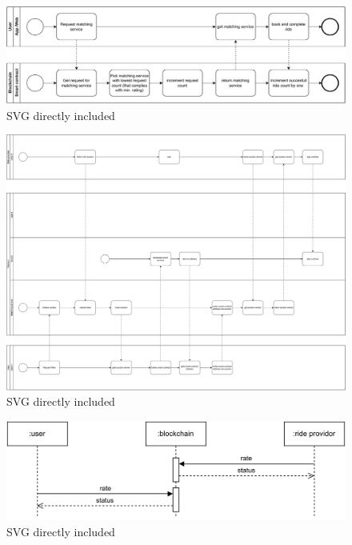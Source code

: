 \begin{figure}
    \centering
    \includegraphics[width=\linewidth]{data/4.svg}
    \caption{SVG directly included}
    \label{fig:directSVG}
\end{figure}







\begin{figure}
    \centering
    \includegraphics[width=\linewidth]{data/5.svg}
    \caption{SVG directly included}
    \label{fig:directSVG}
\end{figure}







\begin{figure}
    \centering
    \includegraphics[width=\linewidth]{data/6.svg}
    \caption{SVG directly included}
    \label{fig:directSVG}
\end{figure}







